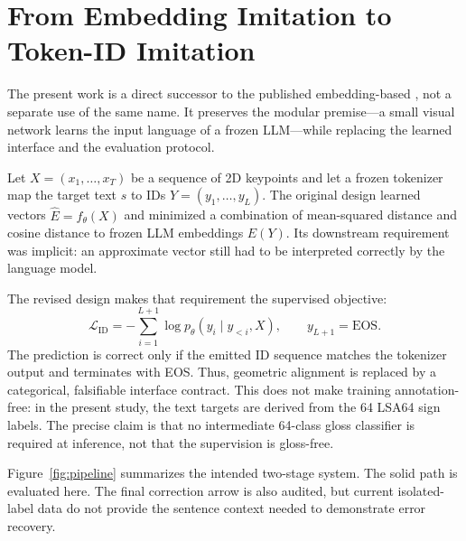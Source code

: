 \section{From Embedding Imitation to Token-ID Imitation}

The present work is a direct successor to the published embedding-based \system{}
\citep{velasquez2026imitator}, not a separate use of the same name.  It preserves
the modular premise---a small visual network learns the input language of a frozen
LLM---while replacing the learned interface and the evaluation protocol.

Let $X=(x_1,\ldots,x_T)$ be a sequence of 2D keypoints and let a frozen tokenizer
map the target text $s$ to IDs $Y=(y_1,\ldots,y_L)$.  The original design learned
vectors $\hat{E}=f_\theta(X)$ and minimized a combination of mean-squared distance
and cosine distance to frozen LLM embeddings $E(Y)$.  Its downstream requirement
was implicit: an approximate vector still had to be interpreted correctly by the
language model.

The revised design makes that requirement the supervised objective:
\begin{equation}
    \mathcal{L}_{\mathrm{ID}}
      = -\sum_{i=1}^{L+1}\log p_\theta(y_i\mid y_{<i},X),
    \qquad y_{L+1}=\mathrm{EOS}.
\end{equation}
The prediction is correct only if the emitted ID sequence matches the tokenizer
output and terminates with EOS.  Thus, geometric alignment is replaced by a
categorical, falsifiable interface contract.  This does not make training
annotation-free: in the present study, the text targets are derived from the 64
LSA64 sign labels.  The precise claim is that no intermediate 64-class gloss
classifier is required at inference, not that the supervision is gloss-free.

Figure~\ref{fig:pipeline} summarizes the intended two-stage system.  The solid
path is evaluated here.  The final correction arrow is also audited, but current
isolated-label data do not provide the sentence context needed to demonstrate
error recovery.

